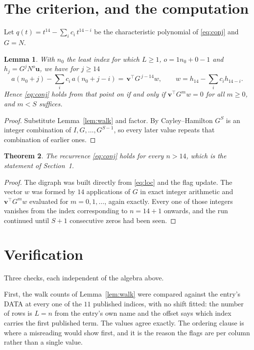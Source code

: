 \documentclass[11pt,a4paper]{article}
\theoremstyle{plain}
\newtheorem{theorem}{Theorem}
\newtheorem{lemma}[theorem]{Lemma}
\theoremstyle{definition}
\begin{document}
\section{The criterion, and the computation}

Let $q(t)=t^{14}-\sum_i c_i\,t^{14-i}$ be the characteristic polynomial of
\eqref{eq:conj} and $G=N$.

\begin{lemma}\label{lem:crit}
With $n_0$ the least index for which $L\ge1$, $o=1n_0+0-1$ and
$h_j=G^{j}N^{o}\mathbf{u}$, we have for $j\ge14$
\[
a(n_0+j)-\sum_i c_i\,a(n_0+j-i)=\,\mathbf{v}^{\!\top}G^{\,j-14}w,
\qquad w=h_{14}-\sum_i c_ih_{14-i} .
\]
Hence \eqref{eq:conj} holds from that point on if and only if
$\mathbf{v}^{\!\top}G^{m}w=0$ for all $m\ge0$, and $m<S$ suffices.
\end{lemma}

\begin{proof}
Substitute Lemma~\ref{lem:walk} and factor. By Cayley--Hamilton $G^{S}$ is an integer
combination of $I,G,\dots,G^{S-1}$, so every later value repeats that combination of earlier
ones.
\end{proof}

\begin{theorem}
The recurrence \eqref{eq:conj} holds for every $n>14$, which is the statement of
Section~1.
\end{theorem}

\begin{proof}
The digraph was built directly from \eqref{eq:loc} and the flag update. The vector $w$ was
formed by $14$ applications of $G$ in exact integer arithmetic and
$\mathbf{v}^{\!\top}G^{m}w$ evaluated for $m=0,1,\dots$, again exactly. Every one of
those integers vanishes from the index corresponding to $n=14+1$ onwards, and the run
continued until $S+1$ consecutive zeros had been seen.
\end{proof}

\section{Verification}

Three checks, each independent of the algebra above.

First, the walk counts of Lemma~\ref{lem:walk} were compared against the entry's DATA at
every one of the $11$ published indices, with no shift fitted: the number of rows is
$L=n$ from the entry's own name and the offset says which index carries the first
published term. The values agree exactly. The ordering clause is where a misreading would
show first, and it is the reason the flags are per column rather than a single value.
\end{document}

